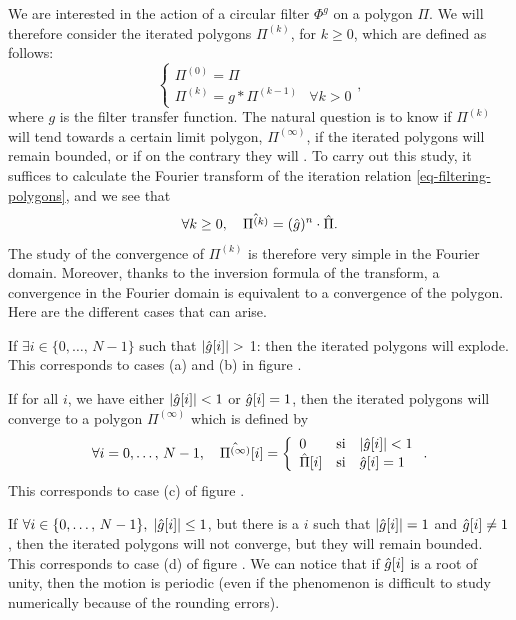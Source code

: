  
 We are interested in the action of a circular filter $ \Phi^g $ on a polygon $ \Pi $. We will therefore consider the iterated polygons $ \Pi^{(k)} $, for $ k \geq 0 $, which are defined as follows:
\begin{equation}
\label{eq-filtering-polygons}
\left\{\begin{array}{ll} \Pi^{(0)} = \Pi & \\\Pi^{(k)} = g * \Pi^{(k-1)} & \forall k> 0 \end{array} \right. ,
\end{equation}
where $ g $ is the filter transfer function. The natural question is to know if $ \Pi^{(k)} $ will tend towards a certain limit polygon, $ \Pi^{(\infty)} $, if the iterated polygons will remain bounded, or if on the contrary they will . To carry out this study, it suffices to calculate the Fourier transform of the iteration relation \eqref{eq-filtering-polygons}, and we see that
\begin{equation*}
\forall k \geq 0, \quad \hat{\Pi^{(k)}} = (\hat{g})^n \cdot \hat{\Pi}.
\end{equation*}
The study of the convergence of $ \Pi^{(k)} $ is therefore very simple in the Fourier domain. Moreover, thanks to the inversion formula of the transform, a convergence in the Fourier domain is equivalent to a convergence of the polygon. Here are the different cases that can arise. \begin{rs}
\item If $ \exists i \in \{0, \ldots, \, N-1 \} $ such that $ | \hat{g}[i] | > $ 1: then the iterated polygons will explode. This corresponds to cases (a) and (b) in figure .
\item If for all $ i $, we have either $ | \hat{g}[i] | <1 $ or $ \hat{g}[i] = 1 $, then the iterated polygons will converge to a polygon $ \Pi^{(\infty)} $ which is defined by
\begin{equation*}
\forall i = 0, \ldots, \, N-1, \quad \hat{\Pi^{(\infty)}}[i] = \left\{\begin{array}{lll} 0 & \text{si} & | \hat{g}[i] | <1 \\\hat{\Pi}[i] & \text{si} & \hat{g}[i] = 1 \end{array} \right. .
\end{equation*}
This corresponds to case (c) of figure .
\item If $ \forall i \in \{0, \ldots, \, N-1 \}, \; | \hat{g}[i] | \leq 1 $, but there is a $ i $ such that $ | \hat{g}[i] | = 1 $ and $ \hat{g}[i] \neq 1 $, then the iterated polygons will not converge, but they will remain bounded. This corresponds to case (d) of figure . We can notice that if $ \hat{g}[i] $ is a root of unity, then the motion is periodic (even if the phenomenon is difficult to study numerically because of the rounding errors).
\end{rs} 

